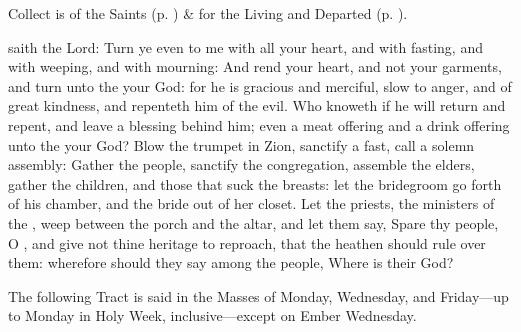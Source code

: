 \begin{rubric}
     Collect is of the Saints (p. \pageref{SPSaints}) \&  for the Living and Departed (p. \pageref{SPLivingDeparted}).
\end{rubric}
 saith the Lord: Turn ye even to me with all your heart, and with fasting, and with weeping, and with mourning: And rend your heart, and not your garments, and turn unto the  your God: for he is gracious and merciful, slow to anger, and of great kindness, and repenteth him of the evil. Who knoweth if he will return and repent, and leave a blessing behind him; even a meat offering and a drink offering unto the  your God? Blow the trumpet in Zion, sanctify a fast, call a solemn assembly: Gather the people, sanctify the congregation, assemble the elders, gather the children, and those that suck the breasts: let the bridegroom go forth of his chamber, and the bride out of her closet. Let the priests, the ministers of the , weep between the porch and the altar, and let them say, Spare thy people, O , and give not thine heritage to reproach, that the heathen should rule over them: wherefore should they say among the people, Where is their God?

\begin{rubric}
    The following Tract is said in the Masses of Monday, Wednesday, and Friday---up to Monday in Holy Week, inclusive---except on Ember Wednesday.
\end{rubric}

